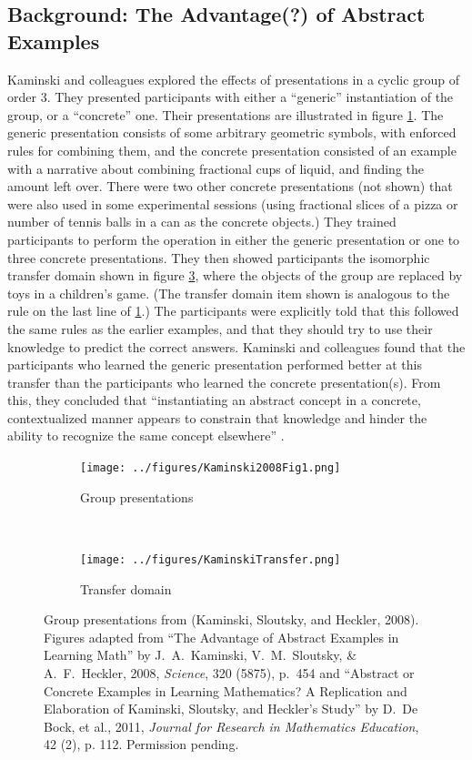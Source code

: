 \documentclass[man,10pt]{apa6}
\begin{document}
\subsection{Background: The Advantage(?) of Abstract Examples}
Kaminski and colleagues \cite{Kaminski2008} explored the effects of presentations in a cyclic group of order 3. They presented participants with either a ``generic'' instantiation of the group, or a ``concrete'' one. Their presentations are illustrated in figure \ref{kaminskitraining}. The generic presentation consists of some arbitrary geometric symbols, with enforced rules for combining them, and the concrete presentation consisted of an example with a narrative about combining fractional cups of liquid, and finding the amount left over. There were two other concrete presentations (not shown) that were also used in some experimental sessions (using fractional slices of a pizza or number of tennis balls in a can as the concrete objects.) They trained participants to perform the operation in either the generic presentation or one to three concrete presentations. They then showed participants the isomorphic transfer domain shown in figure \ref{kaminskitransfer}, where the objects of the group are replaced by toys in a children's game. (The transfer domain item shown is analogous to the rule on the last line of \ref{kaminskitraining}.) The participants were explicitly told that this followed the same rules as the earlier examples, and that they should try to use their knowledge to predict the correct answers. Kaminski and colleagues found that the participants who learned the generic presentation performed better at this transfer than the participants who learned the concrete presentation(s). From this, they concluded that ``instantiating an abstract concept in a concrete, contextualized manner appears to constrain that knowledge and hinder the ability to recognize the same concept elsewhere'' \cite{Kaminski2008}. \par
\begin{figure} \centering \begin{subfigure}{0.5\textwidth} \caption{Group presentations} \label{kaminskitraining} \texttt{[image: ../figures/Kaminski2008Fig1.png]} \end{subfigure} \\ \begin{subfigure}{0.5\textwidth} \caption{Transfer domain} \label{kaminskitransfer} \texttt{[image: ../figures/KaminskiTransfer.png]} \end{subfigure} \caption{Group presentations from (Kaminski, Sloutsky, and Heckler, 2008). Figures adapted from ``The Advantage of Abstract Examples in Learning Math'' by J.\ A.\ Kaminski, V.\ M.\ Sloutsky, \& A.\ F.\ Heckler, 2008,  \textit{Science}, 320 (5875), p.\ 454 and ``Abstract or Concrete Examples in Learning Mathematics? A Replication and Elaboration of Kaminski, Sloutsky, and Heckler's Study'' by D.\ De Bock, et al., 2011, \textit{Journal for Research in Mathematics Education}, 42 (2), p. 112.  Permission pending.} \end{figure}\noindent
\end{document}

